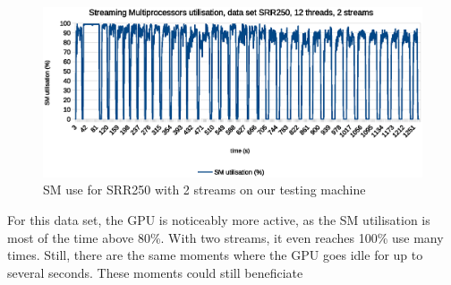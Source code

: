 \begin{figure}[h]
	\centering
	\includegraphics[width=0.9\linewidth]{SM_utilisation_12threads2streams_SRR250}
	\caption{SM use for SRR250 with 2 streams on our testing machine}
	\label{fig:sm-use-srr250-2str}
\end{figure}

For this data set, the GPU is noticeably more active, as the SM utilisation is most of the time above 80\%. With two streams, it even reaches 100\% use many times. Still, there are the same moments where the GPU goes idle for up to several seconds. These moments could still beneficiate
